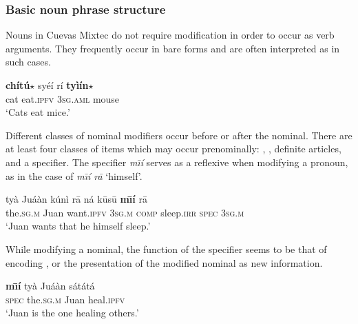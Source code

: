 \documentclass[output=paper,modfonts,nonflat]{langsci/langscibook}
\begin{document}
\subsubsection{Basic noun phrase structure} \label{sec:cisneros:3.3.2}

Nouns in Cuevas Mixtec do not require modification in order to occur as verb arguments.  They frequently occur in bare forms and are often interpreted as  in such cases.

\ea {}\label{ex:cisneros:27}
\gll \textbf{ch\'it\'u$\star$} sy\'e\'i r\'i \textbf{ty\`i\'in$\star$}\\
cat eat.\textsc{ipfv} 3\textsc{sg.aml} mouse\\
\glt `Cats eat mice.'
\z 

Different classes of nominal modifiers occur before or after the nominal.  There are at least four classes of items which may occur prenominally: , , definite articles, and a specifier.  The specifier \textit{m\=\i\'i} serves as a reflexive when modifying a pronoun, as in the case of \textit{m\=\i\'i r\=a} `himself'.

\ea {}\label{ex:cisneros:28}
\gll
{\ob}ty\`a Ju\'a\`an{\cb} k\'un\`i r\=a {\ob}n\'a k\=us\=u \textbf{m\=\i\'i} r\=a{\cb}\\
{\db}the.\textsc{sg.m} Juan want.\textsc{ipfv} 3\textsc{sg.m} {\db}\textsc{comp} sleep.\textsc{irr} \textsc{spec} 3\textsc{sg.m}\\
\glt
`Juan wants that he himself sleep.'
\z

While modifying a nominal, the function of the specifier seems to be that of encoding , or the presentation of the modified nominal as new information.

\ea {}\label{ex:cisneros:29}
\gll
{\ob}\textbf{m\=\i\'i} ty\`a Ju\'a\`an{\cb} s\'at\'at\'a\\
{\db}\textsc{spec} the.\textsc{sg.m} Juan heal.\textsc{ipfv}\\
\glt
`Juan is the one healing others.'
\z 

\z 
\end{document}
